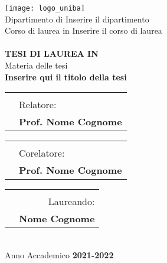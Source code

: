 \begin{titlepage}
    \begin{center}
        \texttt{[image: logo\_uniba]}\\
        \vspace{1cm}
        {\large Dipartimento di Inserire il dipartimento}\\
        \vspace{1cm}
        {\large Corso di laurea in Inserire il corso di laurea}\\
        \hrulefill \\
        \vspace{2cm}
        {\large \textbf{TESI DI LAUREA IN}}\\
        \vspace{0.5cm}
        {\large Materia delle tesi}\\
        \vspace{2cm}
        {\LARGE\textbf{Inserire qui il titolo della tesi}}\\
        \vspace{2cm}

        \vfill
        
        \begin{tabularx}{\textwidth}{@{}lX}
          & \\
          & {\large Relatore:} \\
          & {\large \textbf{Prof. Nome Cognome}}
        \end{tabularx}

        \begin{tabularx}{\textwidth}{@{}lX}
            & \\
            & {\large Corelatore:} \\
            & {\large \textbf{Prof. Nome Cognome}}
          \end{tabularx}

        \begin{tabularx}{\textwidth}{Xr@{}}
          & \\
          & {\large Laureando:} \\
          & {\large \textbf{Nome Cognome}}
        \end{tabularx}

        \vspace{1cm}
        \hrulefill \\
        \vspace{1cm}
        {\large Anno Accademico \textbf{2021-2022}}
    \end{center}
\end{titlepage}